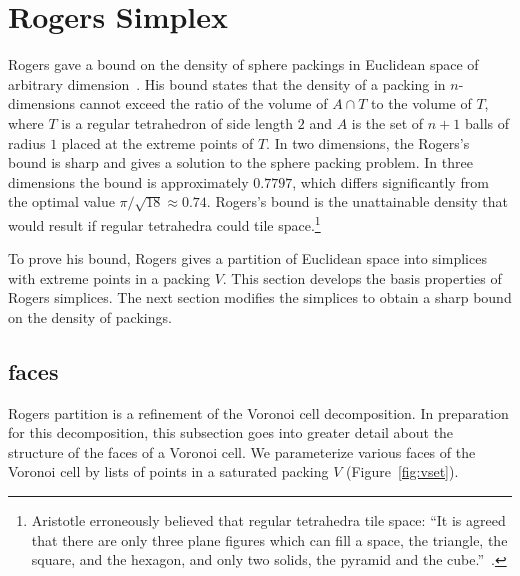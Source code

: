 \section{Rogers Simplex}\label{sec:rogers}




Rogers gave a bound on the density of sphere packings in Euclidean
space of arbitrary dimension~\cite{Rogers:1958:Packing}.  His bound
states that the density of a packing in $n$-dimensions cannot exceed
the ratio of the volume of $A \cap T$ to the volume of $T$, where $T$
is a regular tetrahedron of side length $2$ and $A$ is the set of
$n+1$ balls of radius $1$ placed at the extreme points of $T$.  In two
dimensions, the Rogers's bound is sharp and gives a solution to the
sphere packing problem.  In three dimensions the bound is
approximately $0.7797$, which differs significantly from the optimal
value $\pi/\sqrt{18}\approx 0.74$.  Rogers's bound is the unattainable
density that would result if regular tetrahedra could tile
space.\footnote{Aristotle erroneously believed that regular tetrahedra
  tile space: ``It is agreed that there are only three plane figures
  which can fill a space, the triangle, the square, and the hexagon,
  and only two solids, the pyramid and the cube.''~\cite{Aristotle}.}

To prove his bound, Rogers gives a partition of Euclidean space into
simplices with extreme points in a packing $V$.  This section develops
the basis properties of Rogers simplices.  The next section modifies
the simplices to obtain a sharp bound on the density of packings.




\subsection{faces}

Rogers partition is a refinement of the Voronoi cell decomposition.
In preparation for this decomposition, this subsection goes into
greater detail about the structure of the faces of a Voronoi cell.  We
parameterize various faces of the Voronoi cell by lists of points in a
saturated packing $V$ (Figure~\ref{fig:vset}).

